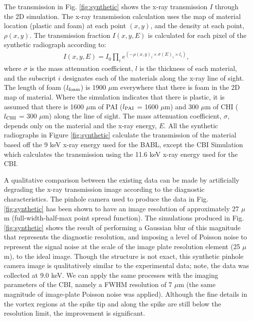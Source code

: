 \documentclass[%
 aip,
 amsmath,amssymb,
 reprint,
 floatfix
]{revtex4-1}
\begin{document}
The transmission in Fig. \ref{fig:synthetic} shows the x-ray transmission $I$ through the 2D simulation. The x-ray transmission calculation uses the map of material location (plastic and foam) at each point $(x,y)$, and the density at each point, $\rho(x,y)$. The transmission fraction $I(x,y, E)$ is calculated for each pixel of the synthetic radiograph according to:
\begin{align}
I(x,y,E) = I_0\prod_i e^{\left(-\rho(x,y)_i \times \sigma(E)_i \times l_i \right)},                                                                                            
\end{align}
where $\sigma$ is the mass attenuation coefficient, $l$ is the thickness of each material, and the subscript $i$ designates each of the materials along the x-ray line of sight. The length of foam ($l_{\rm{foam}}$) is 1900 $\mu$m everywhere that there is foam in the 2D map of material. Where the simulation indicates that there is plastic, it is assumed that there is 1600 $\mu$m of PAI ($l_{\rm{PAI}}$ = 1600 $\mu$m) and 300 $\mu$m of CHI ($l_{\rm{CHI}}$ = 300 $\mu$m) along the line of sight.  The mass attenuation coefficient, $\sigma$, depends only on the material and the x-ray energy, $E$.\cite{XCOM} All the synthetic radiographs in Figure \ref{fig:synthetic} calculate the transmission of the material based off the 9 keV x-ray energy used for the BABL, except the CBI Simulation which calculates the transmission using the 11.6 keV x-ray energy used for the CBI.

A qualitative comparison between the existing data can be made by artificially degrading the x-ray transmission image according to the diagnostic characteristics. The pinhole camera used to produce the data in Fig. \ref{fig:synthetic}  has been shown to have an image resolution of approximately 27 $\mu$m (full-width-half-max point spread function). \cite{Nagel:2017} The simulations produced in Fig. \ref{fig:synthetic} shows the result of performing a Gaussian blur of this magnitude that represents the diagnostic resolution, and imposing a level of Poisson noise to represent the signal noise at the scale of the image plate resolution element (25 $\mu$m), to the ideal image. Though the structure is not exact, this synthetic pinhole camera image is qualitatively similar to the experimental data; note, the data was collected at 9.0 keV. \cite{Nagel:2017} We can apply the same processes with the imaging parameters of the CBI, namely a FWHM resolution of 7 $\mu$m (the same magnitude of image-plate Poisson noise was applied). Although the fine details in the vortex regions at the spike tip and along the spike are still below the resolution limit, the improvement is significant.
\end{document}
